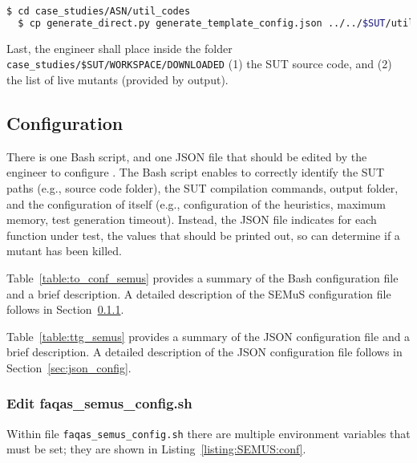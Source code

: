\begin{lstlisting}[language=bash]
  $ cd case_studies/ASN/util_codes
  $ cp generate_direct.py generate_template_config.json ../../$SUT/util_codes
\end{lstlisting}

Last, the engineer shall place inside the folder \texttt{case\_studies/\$SUT/WORKSPACE/DOWNLOADED} (1) the SUT source code, and (2) the list of live mutants (provided by \MASS output).

\subsection{\SEMUS Configuration}

There is one Bash script, and one JSON file that should be edited by the engineer to configure \SEMUS. The Bash script enables \SEMUS to correctly identify the SUT paths (e.g., source code folder), the SUT compilation commands, output folder, and the configuration of \SEMUS itself (e.g., configuration of the heuristics, maximum memory, test generation timeout). Instead, the JSON file indicates for each function under test, the values that should be printed out, so \SEMUS can determine if a mutant has been killed.



Table~\ref{table:to_conf_semus} provides a summary of the Bash \SEMUS configuration file and a brief description. A detailed description of the SEMuS configuration file follows in Section~\ref{sec:semus_config}.



Table~\ref{table:ttg_semus} provides a summary of the JSON \SEMUS configuration file and a brief description. A detailed description of the JSON configuration file follows in Section~\ref{sec:json_config}.


\subsubsection{Edit faqas\_semus\_config.sh}
\label{sec:semus_config}

Within file \texttt{faqas\_semus\_config.sh} there are multiple environment variables that must be set; they are shown in Listing~\ref{listing:SEMUS:conf}.

